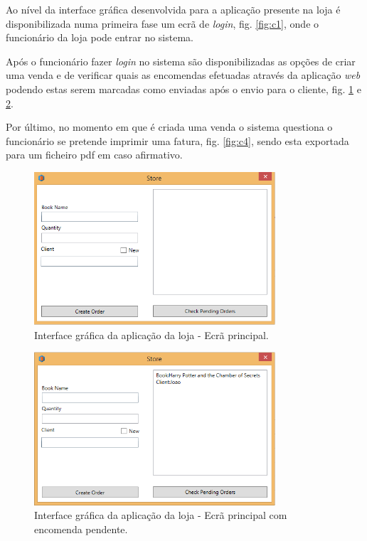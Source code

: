 \documentclass[12pt]{article}
\begin{document}
Ao nível da interface gráfica desenvolvida para a aplicação presente na loja é disponibilizada numa primeira fase um ecrã de \textit{login}, fig. \ref{fig:c1}, onde o funcionário da loja pode entrar no sistema.

Após o funcionário fazer \textit{login} no sistema são disponibilizadas as opções de criar uma venda e de verificar quais as encomendas efetuadas através da aplicação \textit{web} podendo estas serem marcadas como enviadas após o envio para o cliente, fig. \ref{fig:c2} e \ref{fig:c3}.

Por último, no momento em que é criada uma venda o sistema questiona o funcionário se pretende imprimir uma fatura, fig. \ref{fig:c4}, sendo esta exportada para um ficheiro pdf em caso afirmativo.

\begin{figure}[H]
    \centering
    \includegraphics[width=0.8\textwidth]{Store_GUI_Main.png}
    \caption{Interface gráfica da aplicação da loja - Ecrã principal.}
    \label{fig:c2}
\end{figure}
\begin{figure}[H]
    \centering
    \includegraphics[width=0.8\textwidth]{Store_GUI_Order_Pending.png}
    \caption{Interface gráfica da aplicação da loja - Ecrã principal com encomenda pendente.}
    \label{fig:c3}
\end{figure}
\end{document}
